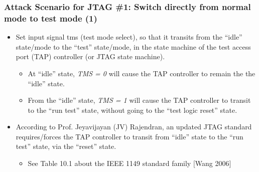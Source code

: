 \documentclass[xcolor={usenames,dvipsnames},hyperref={hyperindex,bookmarks}]{beamer}
\begin{document}
\frame
{
	\frametitle{Attack Scenario for JTAG \#1: Switch directly from normal mode to test mode (1)}

	\begin{itemize}
	\item Set input signal tms (test mode select), so that it transits from the ``idle'' state/mode to the ``test'' state/mode, in the state machine of the test access port (TAP) controller (or JTAG state machine).
		\begin{itemize}
		\item At ``idle'' state, {\it TMS = 0} will cause the TAP controller to remain the the ``idle'' state.
		\item From the ``idle'' state, {\it TMS = 1} will cause the TAP controller to transit to the ``run test'' state, without going to the ``test logic reset'' state.
		\end{itemize}
	\item According to Prof. Jeyavijayan (JV) Rajendran, an updated JTAG standard requires/forces the TAP controller to transit from ``idle'' state to the ``run test'' state, via the ``reset'' state.
		\begin{itemize}
		\item See Table 10.1 about the IEEE 1149 standard family $[$Wang 2006$]$
		\end{itemize}
	\end{itemize}


}
\end{document}
